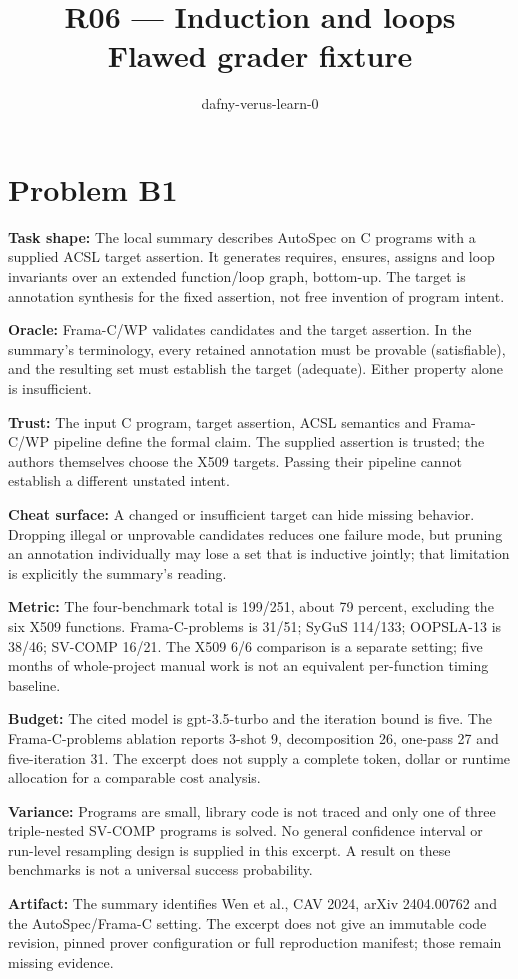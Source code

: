\documentclass[11pt]{article}
\title{R06 --- Induction and loops \\ \large Flawed grader fixture}
\author{dafny-verus-learn-0}
\date{}
\begin{document}
\maketitle
\section*{Problem B1}\label{ans:B1}
\begin{answer}
\textbf{Task shape:} The local summary describes AutoSpec on C programs with a supplied ACSL target assertion. It generates requires, ensures, assigns and loop invariants over an extended function/loop graph, bottom-up. The target is annotation synthesis for the fixed assertion, not free invention of program intent.

\textbf{Oracle:} Frama-C/WP validates candidates and the target assertion. In the summary's terminology, every retained annotation must be provable (satisfiable), and the resulting set must establish the target (adequate). Either property alone is insufficient.

\textbf{Trust:} The input C program, target assertion, ACSL semantics and Frama-C/WP pipeline define the formal claim. The supplied assertion is trusted; the authors themselves choose the X509 targets. Passing their pipeline cannot establish a different unstated intent.

\textbf{Cheat surface:} A changed or insufficient target can hide missing behavior. Dropping illegal or unprovable candidates reduces one failure mode, but pruning an annotation individually may lose a set that is inductive jointly; that limitation is explicitly the summary's reading.

\textbf{Metric:} The four-benchmark total is 199/251, about 79 percent, excluding the six X509 functions. Frama-C-problems is 31/51; SyGuS 114/133; OOPSLA-13 is 38/46; SV-COMP 16/21. The X509 6/6 comparison is a separate setting; five months of whole-project manual work is not an equivalent per-function timing baseline.

\textbf{Budget:} The cited model is gpt-3.5-turbo and the iteration bound is five. The Frama-C-problems ablation reports 3-shot 9, decomposition 26, one-pass 27 and five-iteration 31. The excerpt does not supply a complete token, dollar or runtime allocation for a comparable cost analysis.

\textbf{Variance:} Programs are small, library code is not traced and only one of three triple-nested SV-COMP programs is solved. No general confidence interval or run-level resampling design is supplied in this excerpt. A result on these benchmarks is not a universal success probability.

\textbf{Artifact:} The summary identifies Wen et al., CAV 2024, arXiv 2404.00762 and the AutoSpec/Frama-C setting. The excerpt does not give an immutable code revision, pinned prover configuration or full reproduction manifest; those remain missing evidence.
\end{answer}
\end{document}
